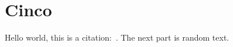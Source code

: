 \chapter{Cinco}
\label{chap:c5}

Hello world, this is a citation:~\cite{Guyton:1956:TextbookPhysiology}.
The next part is random text.

\lipsum


\printbibliography[heading=subbibliography]

